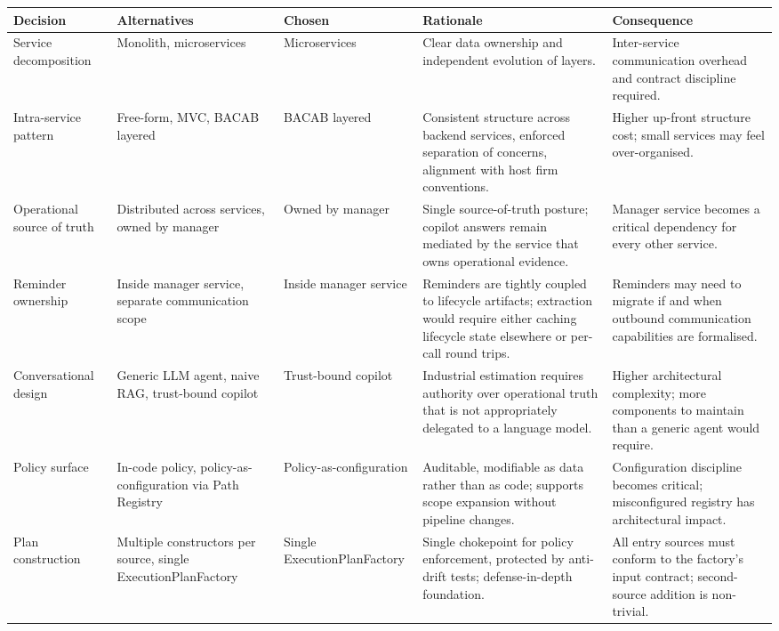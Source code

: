 \begin{table}[H]
\centering
\renewcommand{\arraystretch}{1.3}
\scriptsize
\begin{tabularx}{\textwidth}{|p{2.0cm}|p{2.8cm}|p{2.8cm}|>{\RaggedRight\arraybackslash}X|>{\RaggedRight\arraybackslash}X|}
\hline
\rowcolor{lightgray}
\textbf{Decision} & \textbf{Alternatives} & \textbf{Chosen} & \textbf{Rationale} & \textbf{Consequence} \\ \hline
Service decomposition & Monolith, microservices & Microservices & Clear data ownership and independent evolution of layers. & Inter-service communication overhead and contract discipline required. \\ \hline
Intra-service pattern & Free-form, MVC, BACAB layered & BACAB layered & Consistent structure across backend services, enforced separation of concerns, alignment with host firm conventions. & Higher up-front structure cost; small services may feel over-organised. \\ \hline
Operational source of truth & Distributed across services, owned by manager & Owned by manager & Single source-of-truth posture; copilot answers remain mediated by the service that owns operational evidence. & Manager service becomes a critical dependency for every other service. \\ \hline
Reminder ownership & Inside manager service, separate communication scope & Inside manager service & Reminders are tightly coupled to lifecycle artifacts; extraction would require either caching lifecycle state elsewhere or per-call round trips. & Reminders may need to migrate if and when outbound communication capabilities are formalised. \\ \hline
Conversational design & Generic LLM agent, naive RAG, trust-bound copilot & Trust-bound copilot & Industrial estimation requires authority over operational truth that is not appropriately delegated to a language model. & Higher architectural complexity; more components to maintain than a generic agent would require. \\ \hline
Policy surface & In-code policy, policy-as-configuration via Path Registry & Policy-as-configuration & Auditable, modifiable as data rather than as code; supports scope expansion without pipeline changes. & Configuration discipline becomes critical; misconfigured registry has architectural impact. \\ \hline
Plan construction & Multiple constructors per source, single ExecutionPlanFactory & Single ExecutionPlanFactory & Single chokepoint for policy enforcement, protected by anti-drift tests; defense-in-depth foundation. & All entry sources must conform to the factory's input contract; second-source addition is non-trivial. \\ \hline

\end{tabularx}
\end{table}
